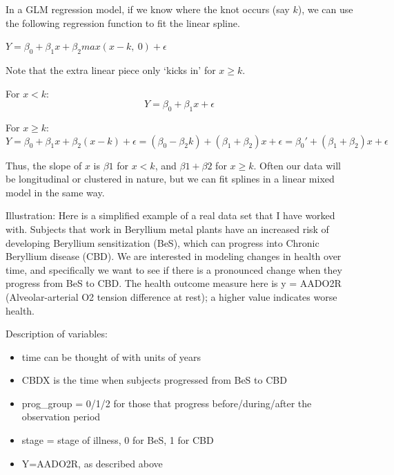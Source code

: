 \documentclass[
  9pt,
  ignorenonframetext,
]{beamer}
\providecommand{\tightlist}{%
  \setlength{\itemsep}{0pt}\setlength{\parskip}{0pt}}
\begin{document}
\begin{frame}{}
\protect\hypertarget{section-1}{}
In a GLM regression model, if we know where the knot occurs (say \(k\)),
we can use the following regression function to fit the linear spline.

\(Y=\beta_0+\beta_1 x+\beta_2 max(x-k,\ 0)+\epsilon\)

Note that the extra linear piece only `kicks in' for \(x\geq k\).

For \(x<k\): \[Y=\beta_0+\beta_1 x+\epsilon\]

For \(x\geq k\): \[
Y=\beta_0+\beta_1 x+\beta_2 (x-k)+\epsilon =
(\beta_0-\beta_2 k)+(\beta_1+\beta_2)x+\epsilon = \beta_0'+(\beta_1+\beta_2) x+\epsilon
\]

Thus, the slope of \(x\) is \(\beta1\) for \(x<k\), and
\(\beta1+\beta2\) for \(x\geq k\). Often our data will be longitudinal
or clustered in nature, but we can fit splines in a linear mixed model
in the same way.
\end{frame}

\begin{frame}{}
\protect\hypertarget{section-2}{}
Illustration: Here is a simplified example of a real data set that I
have worked with. Subjects that work in Beryllium metal plants have an
increased risk of developing Beryllium sensitization (BeS), which can
progress into Chronic Beryllium disease (CBD). We are interested in
modeling changes in health over time, and specifically we want to see if
there is a pronounced change when they progress from BeS to CBD. The
health outcome measure here is y = AADO2R (Alveolar-arterial O2 tension
difference at rest); a higher value indicates worse health.

\begin{block}{Description of variables:}
\protect\hypertarget{description-of-variables}{}
\begin{itemize}
\tightlist
\item
  time can be thought of with units of years
\item
  CBDX is the time when subjects progressed from BeS to CBD
\item
  prog\_group = 0/1/2 for those that progress before/during/after the
  observation period
\item
  stage = stage of illness, 0 for BeS, 1 for CBD
\item
  Y=AADO2R, as described above
\end{itemize}
\end{block}
\end{frame}
\end{document}
